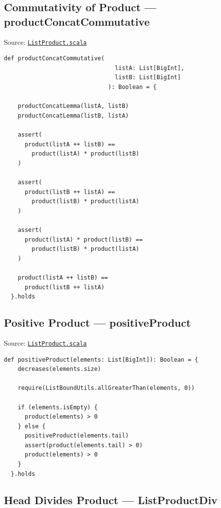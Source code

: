 \subsection{Commutativity of Product --- productConcatCommutative}

Source:
\href{https://github.com/thiagomata/prime-numbers/blob/list-article-v1.0.0/src/main/scala/v1/chapter3/list/properties/ListProduct.scala}{\texttt{ListProduct.scala}}

\begin{lstlisting}[style=scala]
  def productConcatCommutative(
                                listA: List[BigInt],
                                listB: List[BigInt]
                              ): Boolean = {

    productConcatLemma(listA, listB)
    productConcatLemma(listB, listA)

    assert(
      product(listA ++ listB) ==
        product(listA) * product(listB)
    )

    assert(
      product(listB ++ listA) ==
        product(listB) * product(listA)
    )

    assert(
      product(listA) * product(listB) ==
        product(listB) * product(listA)
    )

    product(listA ++ listB) ==
      product(listB ++ listA)
  }.holds
\end{lstlisting}

\subsection{Positive Product --- positiveProduct}

Source:
\href{https://github.com/thiagomata/prime-numbers/blob/list-article-v1.0.0/src/main/scala/v1/chapter3/list/properties/ListProduct.scala}{\texttt{ListProduct.scala}}

\begin{lstlisting}[style=scala]
  def positiveProduct(elements: List[BigInt]): Boolean = {
    decreases(elements.size)

    require(ListBoundUtils.allGreaterThan(elements, 0))

    if (elements.isEmpty) {
      product(elements) > 0
    } else {
      positiveProduct(elements.tail)
      assert(product(elements.tail) > 0)
      product(elements) > 0
    }
  }.holds
\end{lstlisting}

\subsection{Head Divides Product --- ListProductDiv}

